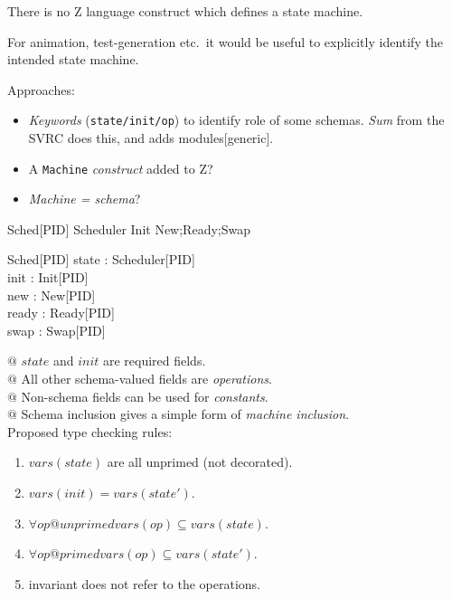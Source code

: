 \begin{slide}

There is no Z language construct which defines a state machine. 

For animation, test-generation etc.~it would be useful to
explicitly identify the intended state machine.

Approaches:
\begin{itemize}
\item \emph{Keywords} (\texttt{state/init/op}) to identify role of some
  schemas.  \emph{Sum} from the SVRC does this, and adds modules[generic].

\item A \texttt{Machine} \emph{construct} added to Z?

\item \emph{Machine = schema}?
\end{itemize}

\begin{machine}{Sched[PID]}
  Scheduler
\machineInit
  Init
\machineOps
  New;Ready;Swap
\end{machine}

\begin{schema}{Sched}[PID]
  state : Scheduler[PID] \\
  init  : Init[PID] \\
  new   : New[PID] \\
  ready : Ready[PID] \\
  swap  : Swap[PID]
\end{schema}

\end{slide}


\begin{slide}

$@$ $state$ and $init$ are required fields. \\
$@$ All other schema-valued fields are \emph{operations}. \\
$@$ Non-schema fields can be used for \emph{constants}. \\
$@$ Schema inclusion gives a simple form of \emph{machine inclusion}.\\

Proposed type checking rules:
\begin{enumerate}
\item $vars(state)$ are all unprimed (not decorated).
\item $vars(init) = vars(state')$.
\item $\forall op @ unprimedvars(op) \subseteq vars(state)$.
\item $\forall op @ primedvars(op) \subseteq vars(state')$.
\item invariant does not refer to the operations.
\end{enumerate}
\end{slide}




